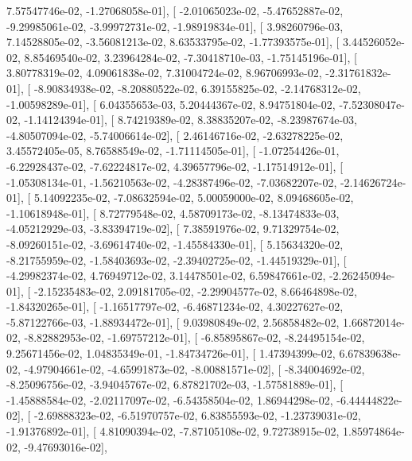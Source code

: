 \documentclass{article}
\begin{document}
          7.57547746e-02,  -1.27068058e-01],
       [ -2.01065023e-02,  -5.47652887e-02,  -9.29985061e-02,
         -3.99972731e-02,  -1.98919834e-01],
       [  3.98260796e-03,   7.14528805e-02,  -3.56081213e-02,
          8.63533795e-02,  -1.77393575e-01],
       [  3.44526052e-02,   8.85469540e-02,   3.23964284e-02,
         -7.30418710e-03,  -1.75145196e-01],
       [  3.80778319e-02,   4.09061838e-02,   7.31004724e-02,
          8.96706993e-02,  -2.31761832e-01],
       [ -8.90834938e-02,  -8.20880522e-02,   6.39155825e-02,
         -2.14768312e-02,  -1.00598289e-01],
       [  6.04355653e-03,   5.20444367e-02,   8.94751804e-02,
         -7.52308047e-02,  -1.14124394e-01],
       [  8.74219389e-02,   8.38835207e-02,  -8.23987674e-03,
         -4.80507094e-02,  -5.74006614e-02],
       [  2.46146716e-02,  -2.63278225e-02,   3.45572405e-05,
          8.76588549e-02,  -1.71114505e-01],
       [ -1.07254426e-01,  -6.22928437e-02,  -7.62224817e-02,
          4.39657796e-02,  -1.17514912e-01],
       [ -1.05308134e-01,  -1.56210563e-02,  -4.28387496e-02,
         -7.03682207e-02,  -2.14626724e-01],
       [  5.14092235e-02,  -7.08632594e-02,   5.00059000e-02,
          8.09468605e-02,  -1.10618948e-01],
       [  8.72779548e-02,   4.58709173e-02,  -8.13474833e-03,
         -4.05212929e-03,  -3.83394719e-02],
       [  7.38591976e-02,   9.71329754e-02,  -8.09260151e-02,
         -3.69614740e-02,  -1.45584330e-01],
       [  5.15634320e-02,  -8.21755959e-02,  -1.58403693e-02,
         -2.39402725e-02,  -1.44519329e-01],
       [ -4.29982374e-02,   4.76949712e-02,   3.14478501e-02,
          6.59847661e-02,  -2.26245094e-01],
       [ -2.15235483e-02,   2.09181705e-02,  -2.29904577e-02,
          8.66464898e-02,  -1.84320265e-01],
       [ -1.16517797e-02,  -6.46871234e-02,   4.30227627e-02,
         -5.87122766e-03,  -1.88934472e-01],
       [  9.03980849e-02,   2.56858482e-02,   1.66872014e-02,
         -8.82882953e-02,  -1.69757212e-01],
       [ -6.85895867e-02,  -8.24495154e-02,   9.25671456e-02,
          1.04835349e-01,  -1.84734726e-01],
       [  1.47394399e-02,   6.67839638e-02,  -4.97904661e-02,
         -4.65991873e-02,  -8.00881571e-02],
       [ -8.34004692e-02,  -8.25096756e-02,  -3.94045767e-02,
          6.87821702e-03,  -1.57581889e-01],
       [ -1.45888584e-02,  -2.02117097e-02,  -6.54358504e-02,
          1.86944298e-02,  -6.44444822e-02],
       [ -2.69888323e-02,  -6.51970757e-02,   6.83855593e-02,
         -1.23739031e-02,  -1.91376892e-01],
       [  4.81090394e-02,  -7.87105108e-02,   9.72738915e-02,
          1.85974864e-02,  -9.47693016e-02],
\end{document}

